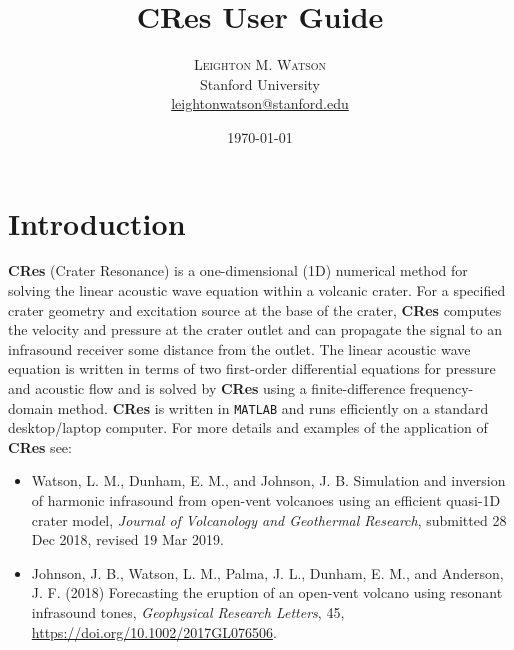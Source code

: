 \documentclass[10pt]{article}
\title{CRes User Guide} %
\author{%
\textsc{Leighton M. Watson} \\%
\normalsize Stanford University \\ %
\normalsize \href{mailto:leightonwatson@stanford.edu}{leightonwatson@stanford.edu} %
}
\date{\today} %
\begin{document}
\maketitle


\section{Introduction}
{\bf CRes} (Crater Resonance) is a one-dimensional (1D) numerical method for solving the linear acoustic wave equation within a volcanic crater. For a specified crater geometry and excitation source at the base of the crater, {\bf CRes} computes the velocity and pressure at the crater outlet and can propagate the signal to an infrasound receiver some distance from the outlet. The linear acoustic wave equation is written in terms of two first-order differential equations for pressure and acoustic flow and is solved by {\bf CRes} using a finite-difference frequency-domain method. {\bf CRes} is written in \texttt{MATLAB} and runs efficiently on a standard desktop/laptop computer. For more details and examples of the application of {\bf CRes} see:
\begin{itemize}
\item Watson, L. M., Dunham, E. M., and Johnson, J. B. Simulation and inversion of harmonic infrasound from open-vent volcanoes using an efficient quasi-1D crater model, \emph{Journal of Volcanology and Geothermal Research}, submitted 28 Dec 2018, revised 19 Mar 2019.
\item Johnson, J. B., Watson, L. M., Palma, J. L., Dunham, E. M., and Anderson, J. F. (2018) Forecasting the eruption of an open-vent volcano using resonant infrasound tones, \emph{Geophysical Research Letters}, 45, \href{https://doi.org/10.1002/2017GL076506}{https://doi.org/10.1002/2017GL076506}.
\end{itemize}
\end{document}
